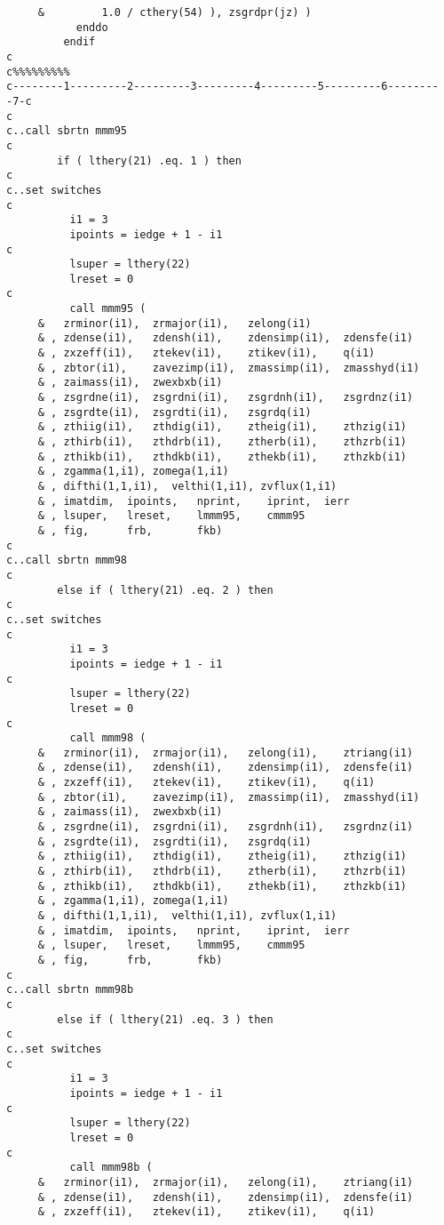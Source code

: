 \begin{verbatim}
     &         1.0 / cthery(54) ), zsgrdpr(jz) )
           enddo
         endif
c
c%%%%%%%%%
c--------1---------2---------3---------4---------5---------6---------7-c
c
c..call sbrtn mmm95
c
        if ( lthery(21) .eq. 1 ) then
c
c..set switches
c
          i1 = 3
          ipoints = iedge + 1 - i1
c
          lsuper = lthery(22)
          lreset = 0
c
          call mmm95 (
     &   zrminor(i1),  zrmajor(i1),   zelong(i1)
     & , zdense(i1),   zdensh(i1),    zdensimp(i1),  zdensfe(i1)
     & , zxzeff(i1),   ztekev(i1),    ztikev(i1),    q(i1)
     & , zbtor(i1),    zavezimp(i1),  zmassimp(i1),  zmasshyd(i1)
     & , zaimass(i1),  zwexbxb(i1)
     & , zsgrdne(i1),  zsgrdni(i1),   zsgrdnh(i1),   zsgrdnz(i1)
     & , zsgrdte(i1),  zsgrdti(i1),   zsgrdq(i1)
     & , zthiig(i1),   zthdig(i1),    ztheig(i1),    zthzig(i1)
     & , zthirb(i1),   zthdrb(i1),    ztherb(i1),    zthzrb(i1)
     & , zthikb(i1),   zthdkb(i1),    zthekb(i1),    zthzkb(i1)
     & , zgamma(1,i1), zomega(1,i1)
     & , difthi(1,1,i1),  velthi(1,i1), zvflux(1,i1)
     & , imatdim,  ipoints,   nprint,    iprint,  ierr
     & , lsuper,   lreset,    lmmm95,    cmmm95
     & , fig,      frb,       fkb)
c
c..call sbrtn mmm98
c
        else if ( lthery(21) .eq. 2 ) then
c
c..set switches
c
          i1 = 3
          ipoints = iedge + 1 - i1
c
          lsuper = lthery(22)
          lreset = 0
c
          call mmm98 (
     &   zrminor(i1),  zrmajor(i1),   zelong(i1),    ztriang(i1)
     & , zdense(i1),   zdensh(i1),    zdensimp(i1),  zdensfe(i1)
     & , zxzeff(i1),   ztekev(i1),    ztikev(i1),    q(i1)
     & , zbtor(i1),    zavezimp(i1),  zmassimp(i1),  zmasshyd(i1)
     & , zaimass(i1),  zwexbxb(i1)
     & , zsgrdne(i1),  zsgrdni(i1),   zsgrdnh(i1),   zsgrdnz(i1)
     & , zsgrdte(i1),  zsgrdti(i1),   zsgrdq(i1)
     & , zthiig(i1),   zthdig(i1),    ztheig(i1),    zthzig(i1)
     & , zthirb(i1),   zthdrb(i1),    ztherb(i1),    zthzrb(i1)
     & , zthikb(i1),   zthdkb(i1),    zthekb(i1),    zthzkb(i1)
     & , zgamma(1,i1), zomega(1,i1)
     & , difthi(1,1,i1),  velthi(1,i1), zvflux(1,i1)
     & , imatdim,  ipoints,   nprint,    iprint,  ierr
     & , lsuper,   lreset,    lmmm95,    cmmm95
     & , fig,      frb,       fkb)
c
c..call sbrtn mmm98b
c
        else if ( lthery(21) .eq. 3 ) then
c
c..set switches
c
          i1 = 3
          ipoints = iedge + 1 - i1
c
          lsuper = lthery(22)
          lreset = 0
c
          call mmm98b (
     &   zrminor(i1),  zrmajor(i1),   zelong(i1),    ztriang(i1)
     & , zdense(i1),   zdensh(i1),    zdensimp(i1),  zdensfe(i1)
     & , zxzeff(i1),   ztekev(i1),    ztikev(i1),    q(i1)

\end{verbatim}
